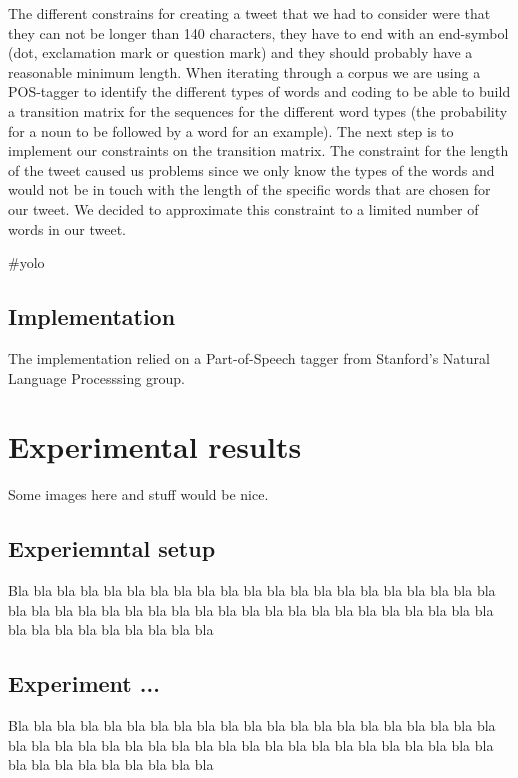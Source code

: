\documentclass[a4paper,12pt]{article}
\begin{document}
The different constrains for creating a tweet that we had to consider were that they can not be longer than 140 characters, they have to end with an end-symbol (dot, exclamation mark or question mark) and they should probably have a reasonable minimum length. When iterating through a corpus we are using a POS-tagger to identify the different types of words and coding to be able to build a transition matrix for the sequences for the different word types (the probability for a noun to be followed by a word for an example). The next step is to implement our constraints on the transition matrix. The constraint for the length of the tweet caused us problems since we only know the types of the words and would not be in touch with the length of the specific words that are chosen for our tweet. We decided to approximate this constraint to a limited number of words in our tweet. 

\#yolo

\subsection{Implementation}
\label{sec:impl}
The implementation relied on a Part-of-Speech tagger from Stanford's Natural Language Processsing group.

\section{Experimental results}
\label{sec:exps}

Some images here and stuff would be nice.

\subsection{Experiemntal setup}
Bla bla bla bla bla bla bla bla bla bla bla bla bla bla bla bla bla 
bla bla bla bla bla bla bla bla bla bla bla bla bla bla bla bla bla 
bla bla bla bla bla bla bla bla bla bla bla bla bla bla bla bla bla 

\subsection{Experiment ...}

Bla bla bla bla bla bla bla bla bla bla bla bla bla bla bla bla bla 
bla bla bla bla bla bla bla bla bla bla bla bla bla bla bla bla bla 
bla bla bla bla bla bla bla bla bla bla bla bla bla bla bla bla bla 
\end{document}

